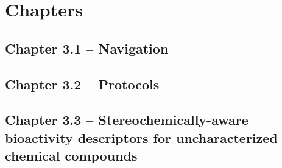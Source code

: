
\chapter{Chapters}
\newpage


\section{Chapter 3.1 -- Navigation}





\newpage



\section{Chapter 3.2 -- Protocols}





\newpage



\section{Chapter 3.3 -- Stereochemically-aware bioactivity descriptors for uncharacterized chemical compounds}






\newpage



